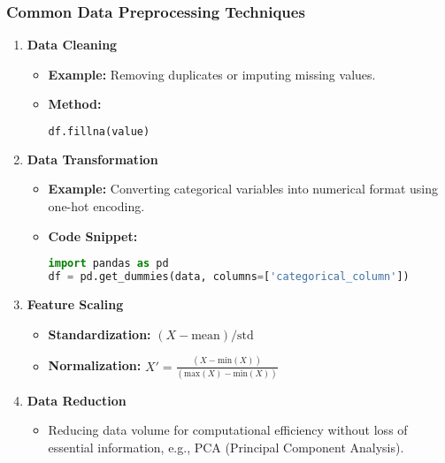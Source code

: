 \documentclass{beamer}
\begin{document}
\begin{frame}[fragile]
    \frametitle{Common Data Preprocessing Techniques}
    \begin{enumerate}
        \item \textbf{Data Cleaning} 
            \begin{itemize}
                \item \textbf{Example:} Removing duplicates or imputing missing values.
                \item \textbf{Method:} 
                \begin{lstlisting}[language=Python]
df.fillna(value)
                \end{lstlisting}
            \end{itemize}
        
        \item \textbf{Data Transformation}
            \begin{itemize}
                \item \textbf{Example:} Converting categorical variables into numerical format using one-hot encoding.
                \item \textbf{Code Snippet:} 
                \begin{lstlisting}[language=Python]
import pandas as pd
df = pd.get_dummies(data, columns=['categorical_column'])
                \end{lstlisting}
            \end{itemize}
        
        \item \textbf{Feature Scaling}
            \begin{itemize}
                \item \textbf{Standardization:} \((X - \text{mean}) / \text{std}\)
                \item \textbf{Normalization:} \(X' = \frac{(X - \text{min}(X))}{(\text{max}(X) - \text{min}(X))}\)
            \end{itemize}

        \item \textbf{Data Reduction}
            \begin{itemize}
                \item Reducing data volume for computational efficiency without loss of essential information, e.g., PCA (Principal Component Analysis).
            \end{itemize}
    \end{enumerate}
\end{frame}
\end{document}
